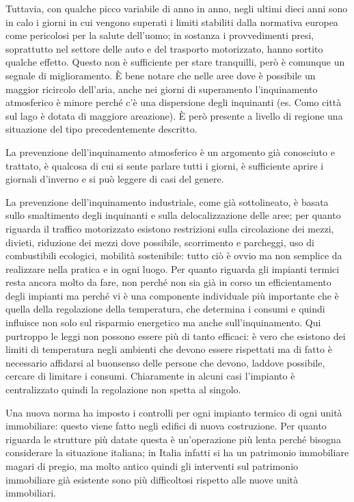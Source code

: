 Tuttavia, con qualche picco variabile di anno in anno, negli ultimi
dieci anni sono in calo i giorni in cui vengono superati i limiti
stabiliti dalla normativa europea come pericolosi per la salute
dell'uomo; in sostanza i provvedimenti presi, soprattutto nel settore
delle auto e del trasporto motorizzato, hanno sortito qualche effetto.
Questo non è sufficiente per stare tranquilli, però è comunque un
segnale di miglioramento. È bene notare che nelle aree dove è possibile
un maggior ricircolo dell'aria, anche nei giorni di superamento
l'inquinamento atmosferico è minore perché c'è una dispersione degli
inquinanti (es. Como città sul lago è dotata di maggiore areazione). È
però presente a livello di regione una situazione del tipo
precedentemente descritto.

La prevenzione dell'inquinamento atmosferico è un argomento già
conosciuto e trattato, è qualcosa di cui si sente parlare tutti i
giorni, è sufficiente aprire i giornali d'inverno e si può leggere di
casi del genere.

La prevenzione dell'inquinamento industriale, come già sottolineato, è
basata sullo smaltimento degli inquinanti e sulla delocalizzazione delle
aree; per quanto riguarda il traffico motorizzato esistono restrizioni
sulla circolazione dei mezzi, divieti, riduzione dei mezzi dove
possibile, scorrimento e parcheggi, uso di combustibili ecologici,
mobilità sostenibile: tutto ciò è ovvio ma non semplice da realizzare
nella pratica e in ogni luogo. Per quanto riguarda gli impianti termici
resta ancora molto da fare, non perché non sia già in corso un
efficientamento degli impianti ma perché vi è una componente individuale
più importante che è quella della regolazione della temperatura, che
determina i consumi e quindi influisce non solo sul risparmio energetico
ma anche sull'inquinamento. Qui purtroppo le leggi non possono essere
più di tanto efficaci: è vero che esistono dei limiti di temperatura
negli ambienti che devono essere rispettati ma di fatto è necessario
affidarsi al buonsenso delle persone che devono, laddove possibile,
cercare di limitare i consumi. Chiaramente in alcuni casi l'impianto è
centralizzato quindi la regolazione non spetta al singolo.

Una nuova norma ha imposto i controlli per ogni impianto termico di ogni
unità immobiliare: questo viene fatto negli edifici di nuova
costruzione. Per quanto riguarda le strutture più datate questa è
un'operazione più lenta perché bisogna considerare la situazione
italiana; in Italia infatti si ha un patrimonio immobiliare magari di
pregio, ma molto antico quindi gli interventi sul patrimonio immobiliare
già esistente sono più difficoltosi rispetto alle nuove unità
immobiliari.

